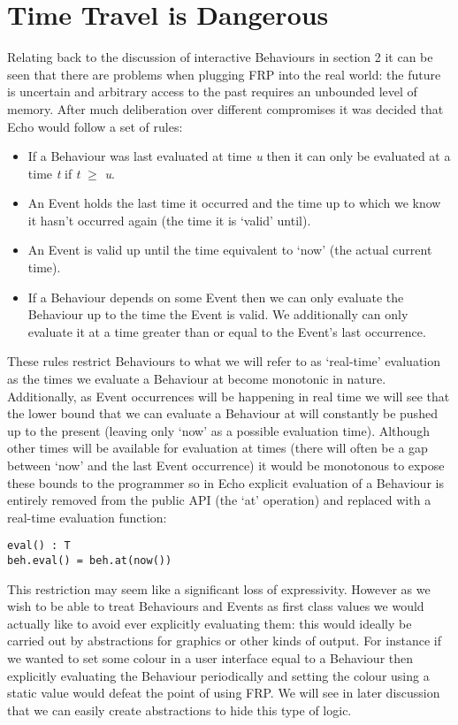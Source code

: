   \section{Time Travel is Dangerous}
    Relating back to the discussion of interactive Behaviours in section 2 it can be seen
    that there are problems when plugging FRP into the real world: the future is uncertain and
    arbitrary access to the past requires an unbounded level of memory. After much deliberation
    over different compromises it was decided that Echo would follow a set of rules:
    
    \begin{itemize}
      \item If a Behaviour was last evaluated at time \emph{u} then it can only be evaluated at
      a time \emph{t} if \emph{t} $\geq$ \emph{u}.
      \item An Event holds the last time it occurred and the time up to which we know it hasn't occurred
      again (the time it is `valid' until).
      \item An Event is valid up until the time equivalent to `now' (the actual current time).
      \item If a Behaviour depends on some Event then we can only evaluate the Behaviour up to
      the time the Event is valid. We additionally can only evaluate it at a time greater than
      or equal to the Event's last occurrence.
    \end{itemize}
    
    These rules restrict Behaviours to what we will refer to as `real-time' evaluation as the times
    we evaluate a Behaviour at become monotonic in nature. Additionally, as Event occurrences will
    be happening in real time we will see that the lower bound that we can evaluate a Behaviour at will
    constantly be pushed up to the present (leaving only `now' as a possible evaluation time). Although
    other times will be available for evaluation at times (there will often be a gap between `now' and
    the last Event occurrence) it would be monotonous to expose these bounds to the programmer so
    in Echo explicit evaluation of a Behaviour is entirely removed from the public API (the
    `at' operation) and replaced with a real-time evaluation function:

\begin{verbatim}
eval() : T
beh.eval() = beh.at(now())
\end{verbatim}  

    This restriction may seem like a significant loss of expressivity. However as we wish to be able to treat
    Behaviours and Events as first class values we would actually like to avoid ever explicitly evaluating
    them: this would ideally be carried out by abstractions for graphics or other kinds of output. For instance
    if we wanted to set some colour in a user interface equal to a Behaviour then explicitly evaluating the Behaviour
    periodically and setting the colour using a static value would defeat the point of using FRP. We will see in later
    discussion that we can easily create abstractions to hide this type of logic.
    
